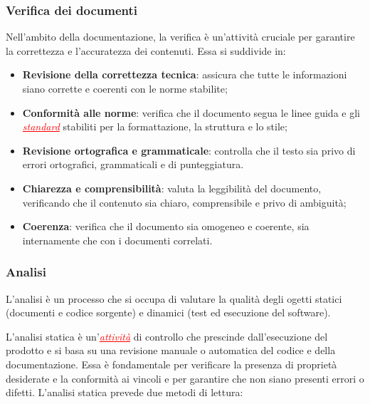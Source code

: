 \begin{itemize}
\subsubsection{Verifica dei documenti} \label{verifica_dei_documenti}
Nell'ambito della documentazione, la verifica è un'attività cruciale per garantire la correttezza e l'accuratezza dei contenuti. Essa si suddivide in:
\begin{itemize}
    \item \textbf{Revisione della correttezza tecnica}: assicura che tutte le informazioni siano corrette e coerenti con le norme stabilite;
    \item \textbf{Conformità alle norme}: verifica che il documento segua le linee guida e gli \textcolor{red}{\uline{\textit{standard}}}
        stabiliti per la formattazione, la struttura e lo stile;
    \item \textbf{Revisione ortografica e grammaticale}: controlla che il testo sia privo di errori ortografici, grammaticali e di punteggiatura.
    \item \textbf{Chiarezza e comprensibilità}: valuta la leggibilità del documento, verificando che il contenuto sia chiaro, comprensibile e privo di ambiguità;
    \item \textbf{Coerenza}: verifica che il documento sia omogeneo e coerente, sia internamente che con i documenti correlati.
\end{itemize}

\subsubsection{Analisi}
L'analisi è un processo che si occupa di valutare la qualità degli ogetti statici (documenti e codice sorgente) e dinamici
(test ed esecuzione del software).

L'analisi statica è un'\textcolor{red}{\uline{\textit{attività}}} di controllo che prescinde dall'esecuzione del prodotto e si basa su una revisione manuale o automatica
del codice e della documentazione. Essa è fondamentale per verificare la presenza di proprietà desiderate e la conformità ai vincoli e
per garantire che non siano presenti errori o difetti. L'analisi statica prevede due metodi di lettura:


\end{itemize}

